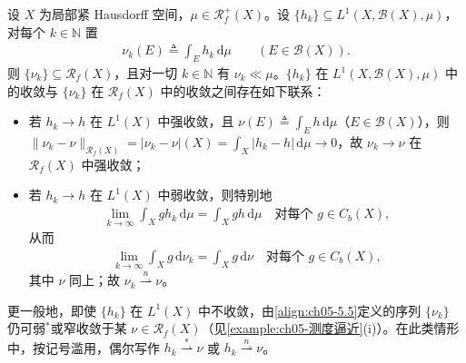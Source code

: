 \documentclass[../../main.tex]{subfiles}%
\begin{document}
\begin{remark}\label{remark:ch05-函数转测度}
设 $X$ 为局部紧 Hausdorff 空间，$\mu\in\mathscr{R}^+_f(X)$。设 $\{h_k\}\subseteq L^1(X,\mathscr{B}(X),\mu)$，对每个 $k\in\mathbb{N}$ 置
\begin{align}
\nu_k(E)\triangleq \int_E h_k\,\mathrm{d}\mu\qquad(E\in\mathscr{B}(X)).\label{align:ch05-5.5}
\end{align}
则 $\{\nu_k\}\subseteq\mathscr{R}_f(X)$，且对一切 $k\in\mathbb{N}$ 有 $\nu_k\ll\mu$。$\{h_k\}$ 在 $L^1(X,\mathscr{B}(X),\mu)$ 中的收敛与 $\{\nu_k\}$ 在 $\mathscr{R}_f(X)$ 中的收敛之间存在如下联系：
\begin{itemize}
\item 若 $h_k\to h$ 在 $L^1(X)$ 中强收敛，且 $\nu(E)\triangleq \int_E h\,\mathrm{d}\mu$（$E\in\mathscr{B}(X)$），则 $\|\nu_k-\nu\|_{\mathscr{R}_f(X)}=|\nu_k-\nu|(X)=\int_X|h_k-h|\,\mathrm{d}\mu\to0$，故 $\nu_k\to\nu$ 在 $\mathscr{R}_f(X)$ 中强收敛；
\item 若 $h_k\to h$ 在 $L^1(X)$ 中弱收敛，则特别地
\begin{align*}
\lim_{k\to\infty}\int_X g h_k\,\mathrm{d}\mu=\int_X g h\,\mathrm{d}\mu
\quad\text{对每个 }g\in C_b(X),
\end{align*}
从而
\begin{align*}
\lim_{k\to\infty}\int_X g\,\mathrm{d}\nu_k=\int_X g\,\mathrm{d}\nu
\quad\text{对每个 }g\in C_b(X),
\end{align*}
其中 $\nu$ 同上；故 $\nu_k\stackrel{n}{\rightharpoonup}\nu$。
\end{itemize}
更一般地，即使 $\{h_k\}$ 在 $L^1(X)$ 中不收敛，由\eqref{align:ch05-5.5}定义的序列 $\{\nu_k\}$ 仍可弱$^*$或窄收敛于某 $\nu\in\mathscr{R}_f(X)$（见\cref{example:ch05-测度逼近}(i)）。在此类情形中，按记号滥用，偶尔写作 $h_k\stackrel{*}{\rightharpoonup}\nu$ 或 $h_k\stackrel{n}{\rightharpoonup}\nu$。
\end{remark}
\end{document}
